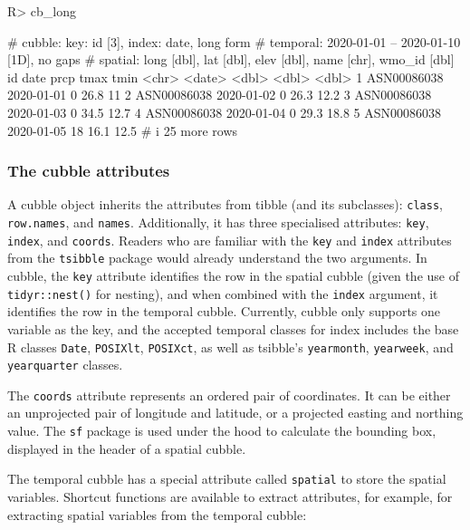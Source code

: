 \documentclass[
  shortnames]{jss}
\begin{document}
\begin{CodeChunk}
\begin{CodeInput}
R> cb_long
\end{CodeInput}
\begin{CodeOutput}
# cubble:   key: id [3], index: date, long form
# temporal: 2020-01-01 -- 2020-01-10 [1D], no gaps
# spatial:  long [dbl], lat [dbl], elev [dbl], name [chr], wmo_id [dbl]
  id          date        prcp  tmax  tmin
  <chr>       <date>     <dbl> <dbl> <dbl>
1 ASN00086038 2020-01-01     0  26.8  11  
2 ASN00086038 2020-01-02     0  26.3  12.2
3 ASN00086038 2020-01-03     0  34.5  12.7
4 ASN00086038 2020-01-04     0  29.3  18.8
5 ASN00086038 2020-01-05    18  16.1  12.5
# i 25 more rows
\end{CodeOutput}
\end{CodeChunk}

\hypertarget{the-cubble-attributes}{%
\subsubsection{The cubble attributes}\label{the-cubble-attributes}}

A cubble object inherits the attributes from tibble (and its subclasses): \texttt{class}, \texttt{row.names}, and \texttt{names}. Additionally, it has three specialised attributes: \texttt{key}, \texttt{index}, and \texttt{coords}. Readers who are familiar with the \texttt{key} and \texttt{index} attributes from the \texttt{tsibble} package would already understand the two arguments. In cubble, the \texttt{key} attribute identifies the row in the spatial cubble (given the use of \texttt{tidyr::nest()} for nesting), and when combined with the \texttt{index} argument, it identifies the row in the temporal cubble. Currently, cubble only supports one variable as the key, and the accepted temporal classes for index includes the base R classes \texttt{Date}, \texttt{POSIXlt}, \texttt{POSIXct}, as well as tsibble's \texttt{yearmonth}, \texttt{yearweek}, and \texttt{yearquarter} classes.

The \texttt{coords} attribute represents an ordered pair of coordinates. It can be either an unprojected pair of longitude and latitude, or a projected easting and northing value. The \texttt{sf} package is used under the hood to calculate the bounding box, displayed in the header of a spatial cubble.

The temporal cubble has a special attribute called \texttt{spatial} to store the spatial variables. Shortcut functions are available to extract attributes, for example,  for extracting spatial variables from the temporal cubble:
\end{document}
